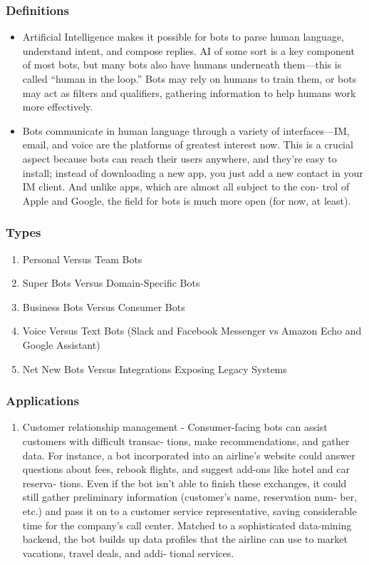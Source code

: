\documentclass[11pt]{beamer}
\begin{document}
\begin{frame}
	\frametitle{Definitions}
	\begin{itemize}
		\item Artificial Intelligence makes it possible for bots to parse human language, understand intent, and compose replies. AI of some sort is a key component of most bots, but many bots also have humans underneath them—this is called “human in the loop.” Bots may rely on humans to train them, or bots may act as filters and qualifiers, gathering information to help humans work more effectively.
		\item Bots communicate in human language through a variety of interfaces—IM, email, and voice are the platforms of greatest interest now. This is a crucial aspect because bots can reach their users anywhere, and they’re easy to install; instead of downloading a new app, you just add a new contact in your IM client. And unlike apps, which are almost all subject to the con‐ trol of Apple and Google, the field for bots is much more open (for now, at least).
	\end{itemize}
\end{frame}

\begin{frame}
\frametitle{Types}
\begin{enumerate}
	\item Personal Versus Team Bots
	\item Super Bots Versus Domain-Specific Bots
	\item Business Bots Versus Consumer Bots
	\item Voice Versus Text Bots (Slack and Facebook Messenger vs Amazon Echo and Google Assistant)
	\item Net New Bots Versus Integrations Exposing Legacy Systems
\end{enumerate}
\end{frame}


\begin{frame}
\frametitle{Applications}
\begin{enumerate}
	\item Customer relationship management - Consumer-facing bots can assist customers with difficult transac‐ tions, make recommendations, and gather data. For instance, a bot incorporated into an airline’s website could answer questions about fees, rebook flights, and suggest add-ons like hotel and car reserva‐ tions. Even if the bot isn’t able to finish these exchanges, it could still gather preliminary information (customer’s name, reservation num‐ ber, etc.) and pass it on to a customer service representative, saving considerable time for the company’s call center. Matched to a sophisticated data-mining backend, the bot builds up data profiles that the airline can use to market vacations, travel deals, and addi‐ tional services.
\end{enumerate}
\end{frame}
\end{document}
